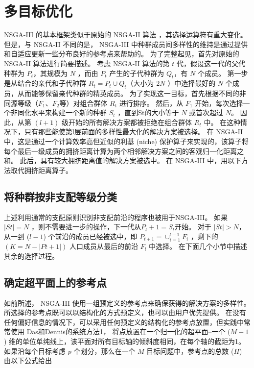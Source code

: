 \section{多目标优化}
NSGA-III 的基本框架类似于原始的 NSGA-II 算法 \cite{NSGA2}，其选择运算符有重大变化。
但是，与 NSGA-II 不同的是， NSGA-III 中种群成员间多样性的维持是通过提供和自适应更新一些分布良好的参考点来帮助的。
为了完整起见，首先对原始的 NSGA-II 算法进行简要描述。
考虑 NSGA-II 算法的第 $t$ 代，假设这一代的父代种群为 $P_t$，其规模为 $N$ ，而由 $P_t$ 产生的子代种群为 $Q_t$，有 $N$ 个成员。
第一步是从结合的亲代和子代种群 $R_t = P_t \cup Q_t$（大小为 $2N$ ）中选择最好的 $N$ 个成员，从而能够保留亲代种群的精英成员。
为了实现这一目标，首先根据不同的非同源等级（$F_1$、$F_2$等）对组合群体 $R_t$ 进行排序。
然后，从 $F_1$ 开始，每次选择一个非同化水平来构建一个新的种群 $S_t$ ，直到St的大小等于 $N$ 或首次超过 $N$。
因此，从第 $(l+1)$ 级开始的所有解决方案都被拒绝在组合群体 $R_t$ 中。
在这种情况下，只有那些能使第l层前面的多样性最大化的解决方案被选择。
在 NSGA-II 中，这是通过一个计算效率高但近似的利基 (niche) 保护算子来实现的，该算子将每个最后一级成员的拥挤距离计算为两个相邻解决方案之间的客观归一化距离之和。
此后，具有较大拥挤距离值的解决方案被选中。
在 NSGA-III 中，用以下方法取代拥挤距离算子。

\subsection{将种群按非支配等级分类}

上述利用通常的支配原则\cite{chankong1983}识别非支配前沿的程序也被用于NSGA-III。
如果 $|St|=N$ ，则不需要进一步的操作，下一代从$P_t+1=S_t$开始。
对于 $|St|>N$，从一到 ($l-1$) 个前沿的成员已经被选中，即 $P_{t+1}= \cup_{i=1}^{l-1} F_i$ ，剩下的 $(K=N-|Pt+1|)$ 人口成员从最后的前沿 $F_l$ 中选择。
在下面几个小节中描述其余的选择过程。

\subsection{确定超平面上的参考点}

如前所述， NSGA-III 使用一组预定义的参考点来确保获得的解决方案的多样性。
所选择的参考点既可以以结构化的方式预定义，也可以由用户优先提供。
在没有任何偏好信息的情况下，可以采用任何预定义的结构化的参考点放置，但实践中常常使用 Das和Dennis的\cite{das&dennis1998}系统方法1，
将点放置在一个归一化的超平面--一个 ($M-1$) 维的单位单纯线上，该平面对所有目标轴的倾斜度相同，在每个轴的截距为1。
如果沿每个目标考虑 $p$ 个划分，那么在一个 $M$ 目标问题中，参考点的总数 ($H$) 由以下公式给出

